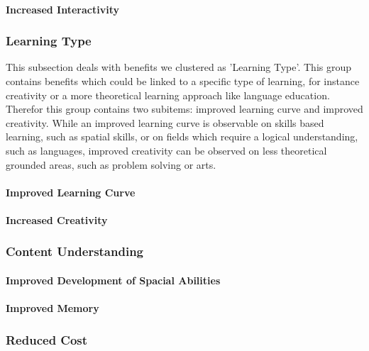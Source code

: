 \paragraph*{Increased Interactivity}
\subsubsection{Learning Type}
This subsection deals with benefits we clustered as 'Learning Type'. This group contains benefits which could be linked to a specific type of learning, for instance creativity or a more theoretical learning approach like language education. \\
Therefor this group contains two subitems: improved learning curve and improved creativity. While an improved learning curve is observable on skills based learning, such as spatial skills, or on fields which require a logical understanding, such as languages, improved creativity can be observed on less theoretical grounded areas, such as problem solving or arts.
\paragraph*{Improved Learning Curve}

\paragraph*{Increased Creativity}
\subsubsection{Content Understanding}
\paragraph*{Improved Development of Spacial Abilities}
\paragraph*{Improved Memory}
\subsubsection{Reduced Cost}